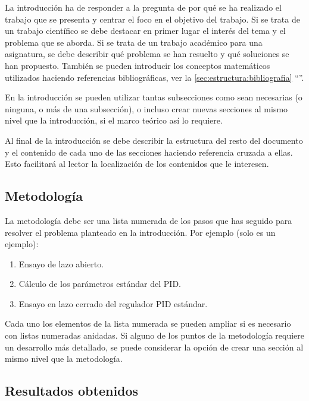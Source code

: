 \documentclass[11pt]{article}
\begin{document}
La introducción ha de responder a la pregunta de por qué se ha realizado el trabajo que se presenta y centrar el foco en el objetivo del trabajo. Si se trata de un trabajo científico se debe destacar en primer lugar el interés del tema y el problema que se aborda. Si se trata de un trabajo académico para una asignatura, se debe describir qué problema se han resuelto y qué soluciones se han propuesto. También se pueden introducir los conceptos matemáticos utilizados haciendo referencias bibliográficas, ver la \autoref{sec:estructura:bibliografia} ``''. 

En la introducción se pueden utilizar tantas subsecciones como sean necesarias (o ninguna, o más de una subsección), o incluso crear nuevas secciones al mismo nivel que la introducción, si el marco teórico así lo requiere.

Al final de la introducción se debe describir la estructura del resto del documento y el contenido de cada uno de las secciones haciendo referencia cruzada a ellas. Esto facilitará al lector la localización de los contenidos que le interesen.

\subsection{Metodología}

La metodología debe ser una lista numerada de los pasos que has seguido para resolver el problema planteado en la introducción. Por ejemplo (solo es un ejemplo):

\begin{enumerate}
    \item Ensayo de lazo abierto.
    \item Cálculo de los parámetros estándar del PID.
    \item Ensayo en lazo cerrado del regulador PID estándar.
\end{enumerate}

Cada uno los elementos de la lista numerada se pueden ampliar si es necesario con listas numeradas anidadas. Si alguno de los puntos de la metodología requiere un desarrollo más detallado, se puede considerar la opción de crear una sección al mismo nivel que la metodología.

\subsection{Resultados obtenidos}
\end{document}
